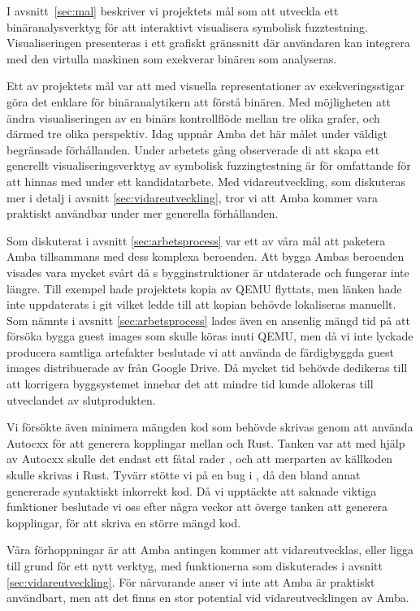I avsnitt~\ref{sec:mal} beskriver vi projektets mål som att utveckla ett
binäranalysverktyg för att interaktivt visualisera symbolisk fuzztestning.
Visualiseringen presenteras i ett grafiskt gränssnitt där användaren kan
integrera med den virtulla maskinen som exekverar binären som analyseras.

Ett av projektets mål var att med visuella representationer av exekveringsstigar
göra det enklare för binäranalytikern att förstå binären. Med möjligheten att
ändra visualiseringen av en binärs kontrollflöde mellan tre olika grafer, och därmed
tre olika perspektiv. Idag uppnår Amba det här målet under väldigt begränsade
förhållanden. Under arbetets gång observerade di att skapa ett generellt
visualiseringsverktyg av symbolisk fuzzingtestning är för omfattande för att
hinnas med under ett kandidatarbete. Med vidareutveckling, som diskuteras mer
i detalj i avsnitt \ref{sec:vidareutveckling}, tror vi att Amba kommer vara
praktiskt användbar under mer generella förhållanden.

Som diskuterat i avsnitt \ref{sec:arbetsprocess} var ett av våra mål att
paketera Amba tillsammans med dess komplexa beroenden. Att bygga Ambas beroenden
visades vara mycket svårt då \stoe{}s bygginstruktioner är utdaterade och
fungerar inte längre. Till exempel hade \stoe{} projektets kopia av QEMU
flyttats, men länken hade inte uppdaterats i git vilket ledde till att kopian
behövde lokaliseras manuellt. Som nämnts i avsnitt \ref{sec:arbetsprocess} lades
även en ansenlig mängd tid på att försöka bygga guest images som skulle köras
inuti QEMU, men då vi inte lyckade producera samtliga artefakter beslutade vi
att använda de färdigbyggda guest images distribuerade av \stoe{} från Google
Drive. Då mycket tid behövde dedikeras till att korrigera byggsystemet innebar
det att mindre tid kunde allokeras till utveclandet av slutprodukten.

Vi försökte även minimera mängden  kod som behövde skrivas genom
att använda Autocxx för att generera kopplingar mellan  och Rust.
Tanken var att med hjälp av Autocxx skulle det endast ett fåtal rader
, och att merparten av källkoden skulle skrivas i Rust. Tyvärr
stötte vi på en bug i , då den bland annat genererade
syntaktiskt inkorrekt kod. Då vi upptäckte att  saknade
viktiga funktioner beslutade vi oss efter några veckor att överge tanken att
generera kopplingar, för att skriva en större mängd  kod.

Våra förhoppningar är att Amba antingen kommer att vidareutvecklas, eller ligga
till grund för ett nytt verktyg, med funktionerna som diskuterades i avsnitt
\ref{sec:vidareutveckling}. För närvarande anser vi inte att Amba är praktiskt
användbart, men att det finns en stor potential vid vidareutvecklingen av Amba.
